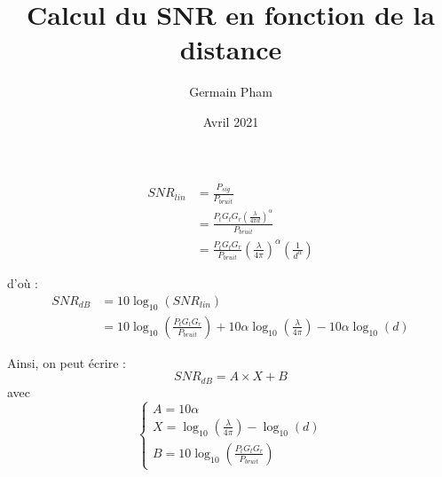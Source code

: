 \documentclass[a4paper,10pt]{article}
\author{Germain Pham}
\title{Calcul du SNR en fonction de la distance}
\date{Avril 2021}
\begin{document}
   \maketitle

\begin{align}
    SNR_{lin} 
    &= \frac{P_{sig}}{P_{bruit}}\\
    &= \frac{
        P_{t}G_{t}G_{r}\left(\frac {\lambda }{4\pi d}\right)^{\alpha}
    }{P_{bruit}}\\
    &= \frac{P_{t}G_{t}G_{r}}{P_{bruit}} \left(\frac {\lambda }{4\pi }\right)^\alpha \left(\frac {1 }{ d^\alpha}\right)
\end{align}

d'où :
\begin{align}
    SNR_{dB} 
    &= 10\log_{10}(SNR_{lin}) \\
    &= 10\log_{10}\left( \frac{P_{t}G_{t}G_{r}}{P_{bruit}} \right) 
    + 10 \alpha \log_{10}\left( \frac {\lambda }{4\pi } \right) 
    - 10 \alpha \log_{10}(d)
\end{align}

Ainsi, on peut écrire : 
\begin{equation}
    SNR_{dB} = A \times X + B
\end{equation}
avec
\begin{equation}
    \begin{cases}
        A = 10 \alpha\\
        X = \log_{10}\left( \frac {\lambda }{4\pi } \right)  - \log_{10}(d)\\
        B = 10\log_{10}\left( \frac{P_{t}G_{t}G_{r}}{P_{bruit}} \right) 
    \end{cases}
\end{equation}
\end{document}
